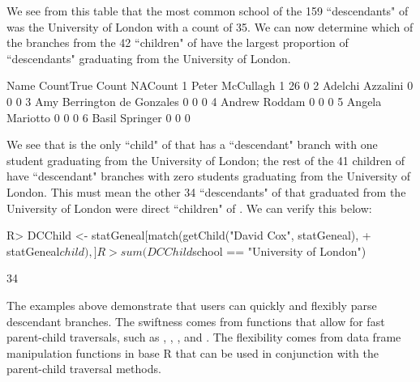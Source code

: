 \documentclass[article,shortnames]{jss}
\begin{document}
We see from this table that the most common school of the 159 ``descendants" of  was the University of London with a count of 35. We can now determine which of the branches from the 42 ``children" of  have the largest proportion of ``descendants" graduating from the University of London.

\begin{CodeChunk}
\begin{CodeOutput}
                        Name CountTrue Count NACount
1            Peter McCullagh         1    26       0
2           Adelchi Azzalini         0     0       0
3 Amy Berrington de Gonzales         0     0       0
4              Andrew Roddam         0     0       0
5            Angela Mariotto         0     0       0
6             Basil Springer         0     0       0
\end{CodeOutput}
\end{CodeChunk}

We see that  is the only ``child" of  that has a ``descendant" branch with one student graduating from the University of London; the rest of the 41 children of  have ``descendant" branches with zero students graduating from the University of London. This must mean the other 34 ``descendants" of  that graduated from the University of London were direct ``children" of . We can verify this below:

\begin{CodeChunk}
\begin{CodeInput}
R> DCChild <- statGeneal[match(getChild("David Cox", statGeneal),
+    statGeneal$child), ]
R> sum(DCChild$school == "University of London")
\end{CodeInput}
\begin{CodeOutput}
[1] 34
\end{CodeOutput}
\end{CodeChunk}

The examples above demonstrate that users can quickly and flexibly parse descendant branches. The swiftness comes from  functions that allow for fast parent-child traversals, such as , , , and . The flexibility comes from data frame manipulation functions in base R that can be used in conjunction with the parent-child traversal methods.
\end{document}
